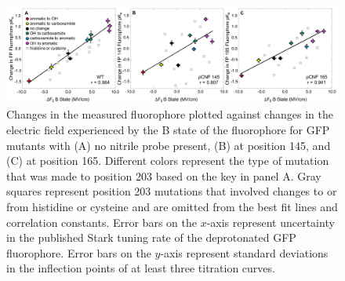 \begin{figure}
    \center
    \includegraphics[width=\double]{figures-gfp-pKa/pKa_vs_elec_stark.png}
    \caption[Fluorophore \pKa{} compared to the field reported by the electronic transition of the fluorophore]{
        Changes in the measured fluorophore \pKa{} plotted against changes in the electric field experienced by the B state of the fluorophore for GFP mutants with (A) no nitrile probe present, (B) \pCNF{} at position 145, and (C) \pCNF{} at position 165. 
        Different colors represent the type of mutation that was made to position 203 based on the key in panel A. 
        Gray squares represent position 203 mutations that involved changes to or from histidine or cysteine and are omitted from the best fit lines and correlation constants. 
        Error bars on the $x$-axis represent uncertainty in the published Stark tuning rate of the deprotonated GFP fluorophore. 
        Error bars on the $y$-axis represent standard deviations in the inflection points of at least three \pKa{} titration curves.
    }
    \label{fig:pKa_vs_stark}
\end{figure}

